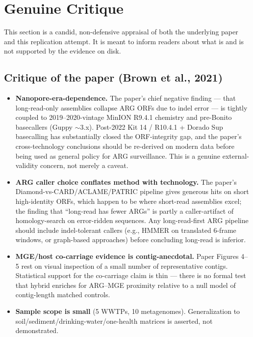 \documentclass[11pt]{article}
\begin{document}
\section{Genuine Critique}
This section is a candid, non-defensive appraisal of both the underlying paper and this replication attempt. It is meant to inform readers about what is and is not supported by the evidence on disk.

\subsection*{Critique of the paper (Brown et al., 2021)}
\begin{itemize}
\item \textbf{Nanopore-era-dependence.} The paper's chief negative finding --- that long-read-only assemblies collapse ARG ORFs due to indel error --- is tightly coupled to 2019--2020-vintage MinION R9.4.1 chemistry and pre-Bonito basecallers (Guppy $\sim$3.x). Post-2022 Kit 14 / R10.4.1 + Dorado Sup basecalling has substantially closed the ORF-integrity gap, and the paper's cross-technology conclusions should be re-derived on modern data before being used as general policy for ARG surveillance. This is a genuine external-validity concern, not merely a caveat.
\item \textbf{ARG caller choice conflates method with technology.} The paper's Diamond-vs-CARD/ACLAME/PATRIC pipeline gives generous hits on short high-identity ORFs, which happen to be where short-read assemblies excel; the finding that ``long-read has fewer ARGs'' is partly a caller-artifact of homology-search on error-ridden sequences. Any long-read-first ARG pipeline should include indel-tolerant callers (e.g., HMMER on translated 6-frame windows, or graph-based approaches) before concluding long-read is inferior.
\item \textbf{MGE/host co-carriage evidence is contig-anecdotal.} Paper Figures 4--5 rest on visual inspection of a small number of representative contigs. Statistical support for the co-carriage claim is thin --- there is no formal test that hybrid enriches for ARG--MGE proximity relative to a null model of contig-length matched controls.
\item \textbf{Sample scope is small} (5 WWTPs, 10 metagenomes). Generalization to soil/sediment/drinking-water/one-health matrices is asserted, not demonstrated.
\end{itemize}
\end{document}
